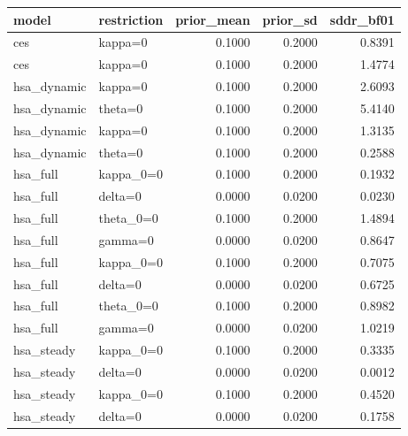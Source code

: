 \begin{tabular}{llrrr}
\toprule
model & restriction & prior\_mean & prior\_sd & sddr\_bf01 \\
\midrule
ces & kappa=0 & 0.1000 & 0.2000 & 0.8391 \\
ces & kappa=0 & 0.1000 & 0.2000 & 1.4774 \\
hsa\_dynamic & kappa=0 & 0.1000 & 0.2000 & 2.6093 \\
hsa\_dynamic & theta=0 & 0.1000 & 0.2000 & 5.4140 \\
hsa\_dynamic & kappa=0 & 0.1000 & 0.2000 & 1.3135 \\
hsa\_dynamic & theta=0 & 0.1000 & 0.2000 & 0.2588 \\
hsa\_full & kappa\_0=0 & 0.1000 & 0.2000 & 0.1932 \\
hsa\_full & delta=0 & 0.0000 & 0.0200 & 0.0230 \\
hsa\_full & theta\_0=0 & 0.1000 & 0.2000 & 1.4894 \\
hsa\_full & gamma=0 & 0.0000 & 0.0200 & 0.8647 \\
hsa\_full & kappa\_0=0 & 0.1000 & 0.2000 & 0.7075 \\
hsa\_full & delta=0 & 0.0000 & 0.0200 & 0.6725 \\
hsa\_full & theta\_0=0 & 0.1000 & 0.2000 & 0.8982 \\
hsa\_full & gamma=0 & 0.0000 & 0.0200 & 1.0219 \\
hsa\_steady & kappa\_0=0 & 0.1000 & 0.2000 & 0.3335 \\
hsa\_steady & delta=0 & 0.0000 & 0.0200 & 0.0012 \\
hsa\_steady & kappa\_0=0 & 0.1000 & 0.2000 & 0.4520 \\
hsa\_steady & delta=0 & 0.0000 & 0.0200 & 0.1758 \\
\bottomrule
\end{tabular}
